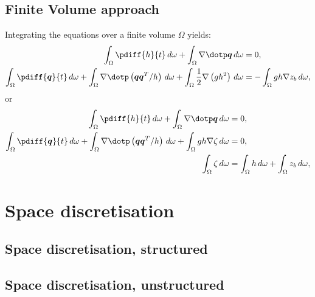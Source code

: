 \subsection*{Finite Volume approach}
Integrating the equations over a finite volume $\Omega$ yields:
\begin{subequations}
    \begin{align}
        \int_\Omega \pdiff{h}{t}\, d\omega
        + \int_\Omega \nabla \dotp \vec{q}\, d\omega & = 0,
        \\
        \int_\Omega \pdiff{\vec{q}}{t}\, d\omega
        + \int_\Omega \nabla \dotp \left( \vec{q}\vec{q}^T/h\right)\, d\omega
        + \int_\Omega \half  \nabla \left( g h^2 \right) \, d\omega & =
        - \int_\Omega gh\nabla z_b\, d\omega,
    \end{align}
    \label{sec:pressure_dependent_on_h}
\end{subequations}
or
\begin{subequations}
\begin{align}
    \int_\Omega \pdiff{h}{t}\, d\omega + \int_\Omega \nabla \dotp \vec{q}\, d\omega & = 0,
    \\
    \int_\Omega \pdiff{\vec{q}}{t}\, d\omega
    + \int_\Omega \nabla \dotp \left( \vec{q}\vec{q}^T/h\right)\, d\omega
    + \int_\Omega gh \nabla \zeta\, d\omega & = 0,
    \\
    \int_\Omega \zeta\, d\omega & = \int_\Omega h\, d\omega + \int_\Omega z_b\, d\omega,
\end{align}
\label{sec:pressure_dependent_on_zeta}
\end{subequations}

\section{Space discretisation}
\notyet
\subsection{Space discretisation, structured}
\notyet
\subsection{Space discretisation, unstructured}
\notyet
